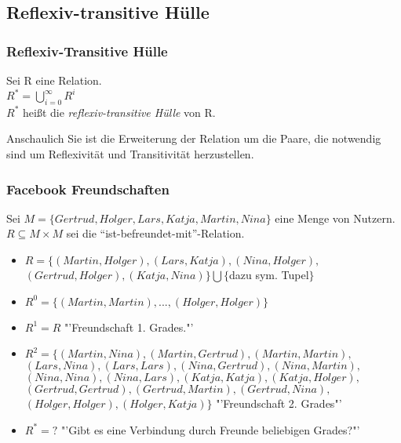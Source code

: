 \subsection{Reflexiv-transitive Hülle}
\begin{frame}
	\frametitle{Reflexiv-Transitive Hülle}
	\begin{definition}
    Sei R eine Relation.\\
		$R^* = \bigcup \limits_{i=0}^{\infty} R^i$\\
		$R^*$ heißt die \emph{reflexiv-transitive Hülle} von R.
	\end{definition} \pause
  \begin{alertblock}{Anschaulich}
		Sie ist die Erweiterung der Relation um die Paare, die notwendig sind um Reflexivität und Transitivität herzustellen.
  \end{alertblock}
\end{frame}

\begin{frame}
	\frametitle{Facebook Freundschaften}
	\begin{exampleblock}{}
    {\small
			Sei $M = \{ Gertrud, Holger, Lars, Katja, Martin, Nina \}$ eine Menge von Nutzern.\\
			$R \subseteq M \times M $ sei die "`ist-befreundet-mit"'-Relation.
		\begin{itemize}
			\item $R = \{ (Martin,Holger), (Lars,Katja), (Nina,Holger),$ \\
						$(Gertrud,Holger), (Katja, Nina) \} \bigcup \{${dazu sym. Tupel}$\}$ \pause
			\item $R^0=\{ (Martin,Martin), ..., (Holger,Holger) \}$ \pause
			\item $R^1=R$ "'Freundschaft 1. Grades."' \pause
			\item $R^2=\{ (Martin,Nina), (Martin,Gertrud), (Martin,Martin),$ \\
						$(Lars,Nina), (Lars,Lars), (Nina,Gertrud),(Nina,Martin),$ \\
						$(Nina,Nina), (Nina,Lars), (Katja,Katja), (Katja,Holger), $ \\
						$(Gertrud,Gertrud), (Gertrud,Martin), (Gertrud,Nina), $ \\
						$(Holger,Holger), (Holger,Katja)\}$ "'Freundschaft 2. Grades"' \pause
			\item $R^*=?$ "'Gibt es eine Verbindung durch Freunde beliebigen Grades?"'
		\end{itemize}
    }
	\end{exampleblock}
\end{frame}

